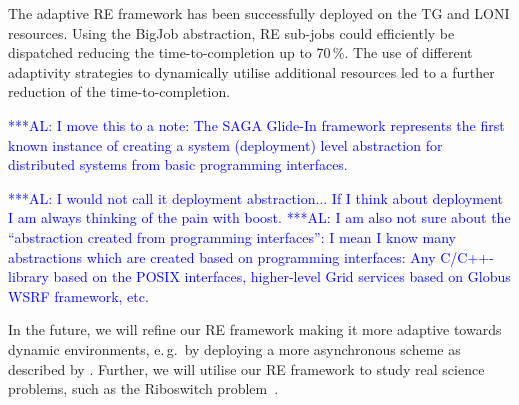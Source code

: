 \documentclass{rspublic}
\newcommand{\alnote}[1]{ {\textcolor{blue} { ***AL: #1 }}}
\newcommand{\alnote}[1]{}
\newcommand{\glidein}[1]{Glide-In }
\begin{document}
The adaptive RE framework has been successfully deployed on
the TG and LONI resources.
Using the BigJob abstraction, RE sub-jobs could efficiently be dispatched 
reducing the time-to-completion up to 70\,\%. The use of different 
adaptivity strategies to dynamically utilise additional resources led 
to a further reduction of the time-to-completion.




\alnote{I move this to a note:
The SAGA \glidein\ framework represents the first known instance of creating a
system (deployment) level abstraction for distributed systems from
basic programming interfaces.} 

\alnote{I would not call it deployment abstraction... If I think about
deployment I am always thinking of the pain with boost.}
\alnote{I am also not sure about the ``abstraction created from 
  programming interfaces'': 
  I mean I know many abstractions which are created based on
  programming interfaces: Any C/C++-library based on the POSIX
  interfaces, higher-level Grid services based on Globus WSRF
  framework, etc.}   


       

                                 


   
        
In the future, we will refine our RE framework making it
more adaptive towards dynamic environments, e.\,g.\ by deploying  
a more asynchronous scheme as described by \citet{Gallicchio:2007yq}.
Further, we will utilise our RE framework to study real science problems,
such as the Riboswitch problem~\citep{Huang:2008xe}.     
\end{document}
